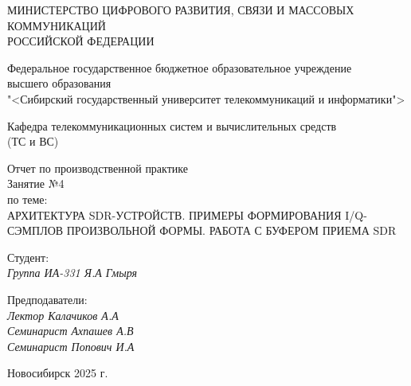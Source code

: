 \thispagestyle{empty}

\begin{center}
    МИНИСТЕРСТВО ЦИФРОВОГО РАЗВИТИЯ, СВЯЗИ И МАССОВЫХ КОММУНИКАЦИЙ \\ РОССИЙСКОЙ ФЕДЕРАЦИИ

    \vspace{20pt}

    Федеральное государственное бюджетное образовательное учреждение  \\  высшего образования \\
    "<Сибирский государственный университет телекоммуникаций и информатики"> \\

    \vspace{20pt}

    Кафедра телекоммуникационных систем и вычислительных средств \\  (ТС и ВС)
\end{center}

\vfill

\begin{center}
    Отчет по производственной практике \\  
    Занятие №4 \\

    \vspace{20pt}
    по теме: \\
    \uppercase{Архитектура SDR-устройств. Примеры формирования I/Q-сэмплов произвольной формы. Работа с буфером приема SDR}
\end{center}

\vfill

    \noindent Студент: \\
    \textit{Группа ИА-331 \hfill Я.А Гмыря}

    \vspace{20pt}

    \noindent Предподаватели: \\
    \textit{Лектор \hfill Калачиков А.А} \\
    \textit{Семинарист \hfill Ахпашев А.В} \\
    \textit{Семинарист \hfill Попович И.А}

\vfill

\begin{center}
    Новосибирск 2025 г.
\end{center}